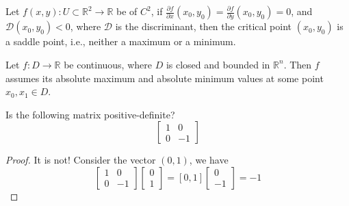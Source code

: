 \documentclass[openany]{book}
\newcommand{\R}{\mathbb{R}}
\begin{document}
\begin{prop}
    Let $f(x,y):U\subset\R^2\to \R$ be of  $C^2$, if $\frac{\partial f}{\partial x}(x_0,y_0)=\frac{\partial f}{\partial y}(x_0,y_0)=0$, and $\mathcal{D}(x_0,y_0)<0$, where $\mathcal{D}$ is the discriminant, then the critical point $(x_0,y_0)$ is a saddle point, i.e., neither a maximum or a minimum.
\end{prop}


\begin{prop}
    Let $f:D\to\R$ be continuous, where $D$ is closed and bounded in $\R^n$. Then $f$ assumes its absolute maximum and absolute minimum values at some point $x_0, x_1\in D$.
\end{prop}


\begin{prob}
    Is the following matrix positive-definite?
    \begin{equation*}
        \begin{bmatrix}
            1&0\\
            0&-1
        \end{bmatrix}
    \end{equation*}
\end{prob}

\begin{proof}
    It is not! Consider the vector $(0,1)$, we have 
    \begin{equation*}
        [0, 1]
\begin{bmatrix}
        1&0\\
        0&-1
    \end{bmatrix}\begin{bmatrix}
        0\\
        1
    \end{bmatrix}
    =[0,1]\begin{bmatrix}
        0\\
        -1
    \end{bmatrix}=-1
\end{equation*}
\end{proof}
\end{document}
